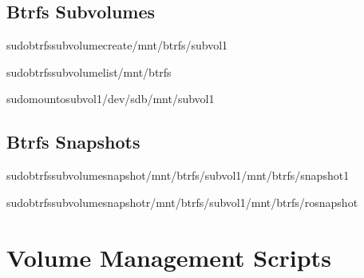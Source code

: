 \documentclass[letterpaper,10pt,english]{sphinxmanual}
\begin{document}
\subsection{Btrfs Subvolumes}
\label{\detokenize{volume-management:btrfs-subvolumes}}
\begin{sphinxVerbatim}[commandchars=\\\{\}]
sudobtrfssubvolumecreate/mnt/btrfs/subvol1

sudobtrfssubvolumelist/mnt/btrfs

sudomount\PYGZhy{}osubvol1/dev/sdb/mnt/subvol1
\end{sphinxVerbatim}


\subsection{Btrfs Snapshots}
\label{\detokenize{volume-management:btrfs-snapshots}}
\begin{sphinxVerbatim}[commandchars=\\\{\}]
sudobtrfssubvolumesnapshot/mnt/btrfs/subvol1/mnt/btrfs/snapshot1

sudobtrfssubvolumesnapshot\PYGZhy{}r/mnt/btrfs/subvol1/mnt/btrfs/ro\PYGZhy{}snapshot
\end{sphinxVerbatim}


\section{Volume Management Scripts}
\label{\detokenize{volume-management:volume-management-scripts}}
\end{document}
